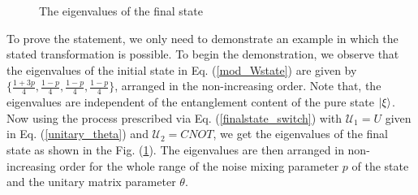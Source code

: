 \begin{figure}[htp]
\centering
{}
\caption{\footnotesize{The eigenvalues of the final state}}
\label{eigenvalues_modW}
\end{figure}

    

   \noindent  To prove the statement, we only need to demonstrate an example in which the stated transformation is possible. To begin the demonstration, we observe that the eigenvalues of the initial state in Eq. (\ref{mod_Wstate}) are given by $\{ \frac{1+3p}{4}, \frac{1-p}{4},\frac{1-p}{4},\frac{1-p}{4} \}$, arranged in the non-increasing order. Note that, the eigenvalues are independent of the entanglement content of the pure state $\ket{\xi}$. Now using the process prescribed via Eq. (\ref{finalstate_switch}) with $\mathcal{U}_1=U$ given in Eq. (\ref{unitary_theta}) and $\mathcal{U}_2=CNOT$, we get the eigenvalues of the final state as shown in the Fig. (\ref{eigenvalues_modW}). The eigenvalues are then arranged in non-increasing order for the whole range of the noise mixing parameter $p$ of the state and the unitary matrix parameter $\theta$. 
    

